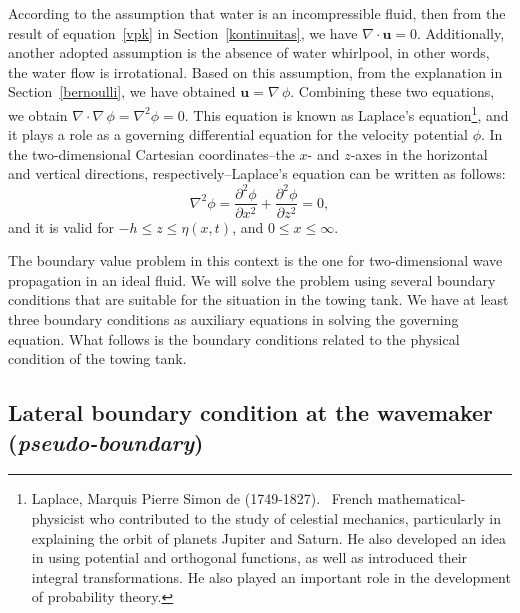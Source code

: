 \documentclass[12pt,a4paper]{report}
\begin{document}
According to the assumption that water is an incompressible fluid, then from the result of equation~\eqref{vpk} in Section~\ref{kontinuitas}, we have $\nabla \cdot \mathbf{u} = 0$. Additionally, another adopted assumption is the absence of water whirlpool, in other words, the water flow is irrotational. Based on this assumption, from the explanation in Section~\ref{bernoulli}, we have obtained $\mathbf{u} = \nabla\,\phi$. Combining these two equations, we obtain $\nabla \cdot \nabla \,\phi = \nabla^{2}\phi = 0$. This equation is known as Laplace's equation\footnote[1]{Laplace, Marquis Pierre Simon de (1749-1827). \ French mathematical-physicist who contributed to the study of celestial mechanics, particularly in explaining the orbit of planets Jupiter and Saturn. He also developed an idea in using potential and orthogonal functions, as well as introduced their integral transformations. He also played an important role in the development of probability theory.}, and it plays a role as a governing differential equation for the velocity potential $\phi$. In the two-dimensional Cartesian coordinates--the $x$- and $z$-axes in the horizontal and vertical directions, respectively--Laplace's equation can be written as follows:
\begin{equation}
\nabla^2\phi = \frac{\partial^2\phi}{\partial x^2} + \frac{\partial^2\phi}{\partial z^2} =0,
\end{equation}
and it is valid for $-h \leq z \leq \eta(x,t)$, and $0 \leq x \leq \infty$.

The boundary value problem in this context is the one for two-dimensional wave propagation in an ideal fluid. We will solve the problem using several boundary conditions that are suitable for the situation in the towing tank. We have at least three boundary conditions as auxiliary equations in solving the governing equation. What follows is the boundary conditions related to the physical condition of the towing tank.

\subsection{Lateral boundary condition at the wavemaker\\ (\emph{pseudo-boundary})}
\end{document}
